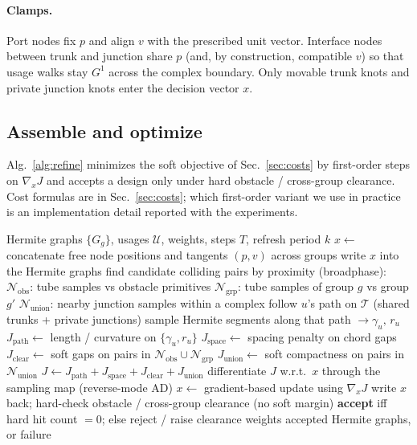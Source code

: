 \paragraph{Clamps.}
Port nodes fix $p$ and align $v$ with the prescribed unit vector.
Interface nodes between trunk and junction share $p$ (and, by construction,
compatible $v$) so that usage walks stay $G^{1}$ across the complex boundary.
Only movable trunk knots and private junction knots enter the decision
vector $x$.

\subsection{Assemble and optimize}
\label{sec:method:opt}

Alg.~\ref{alg:refine} minimizes the soft objective of Sec.~\ref{sec:costs} by
first-order steps on $\nabla_x J$ and accepts a design only under hard obstacle /
cross-group clearance.
Cost formulas are in Sec.~\ref{sec:costs}; which first-order variant we use in
practice is an implementation detail reported with the experiments.

\begin{algorithm}[H]
\caption{Usage assembly and gradient refine (per multi-group instance)}
\label{alg:refine}
\begin{algorithmic}[1]
\Require Hermite graphs $\{G_g\}$, usages $\mathcal{U}$, weights, steps $T$, refresh period $k$
\State $x \leftarrow$ concatenate free node positions and tangents $(p,v)$ across groups
  \State write $x$ into the Hermite graphs
    \State find candidate colliding pairs by proximity (broadphase):
    \Statex \quad $\mathcal{N}_{\mathrm{obs}}$: tube samples vs obstacle primitives
    \Statex \quad $\mathcal{N}_{\mathrm{grp}}$: tube samples of group $g$ vs group $g'$
    \Statex \quad $\mathcal{N}_{\mathrm{union}}$: nearby junction samples within a complex
  \EndIf
    \State follow $u$'s path on $\mathcal{T}$ (shared trunks + private junctions)
    \State sample Hermite segments along that path $\to \gamma_u,\, r_u$
  \EndFor
  \State $J_{\mathrm{path}} \leftarrow$ length / curvature on $\{\gamma_u,r_u\}$
  \State $J_{\mathrm{space}} \leftarrow$ spacing penalty on chord gaps
  \State $J_{\mathrm{clear}} \leftarrow$ soft gaps on pairs in
        $\mathcal{N}_{\mathrm{obs}}\cup\mathcal{N}_{\mathrm{grp}}$
  \State $J_{\mathrm{union}} \leftarrow$ soft compactness on pairs in
        $\mathcal{N}_{\mathrm{union}}$
  \State $J \leftarrow J_{\mathrm{path}}+J_{\mathrm{space}}+J_{\mathrm{clear}}+J_{\mathrm{union}}$
  \State differentiate $J$ w.r.t.\ $x$ through the sampling map (reverse-mode AD)
  \State $x \leftarrow$ gradient-based update using $\nabla_x J$
\EndFor
\State write $x$ back; hard-check obstacle / cross-group clearance (no soft margin)
\State \textbf{accept} iff hard hit count $= 0$; else reject / raise clearance weights
\Ensure accepted Hermite graphs, or failure
\end{algorithmic}
\end{algorithm}
